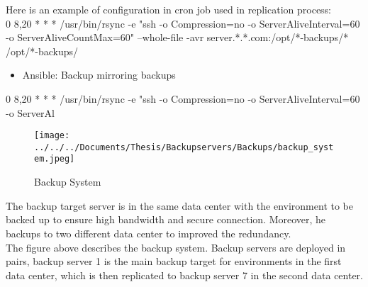 \documentclass[english]{tktltiki2}
\theoremstyle{definition}
\theoremstyle{remark}
\begin{document}
 Here is an example of configuration in cron job used in replication process:\\ 
 
 0 8,20 * * *  \enspace */usr/bin/rsync -e "ssh -o Compression=no -o ServerAliveInterval=60 -o ServerAliveCountMax=60" --whole-file -avr server.*.*.com:/opt/*-backups/* /opt/*-backups/
 \begin{itemize}
 \item Ansible: Backup mirroring backups
 \end{itemize}
0 8,20 * * * \enspace */usr/bin/rsync -e "ssh -o Compression=no -o ServerAliveInterval=60 -o ServerAl\\
\begin{figure}[h!]
\texttt{[image: ../../../Documents/Thesis/Backupservers/Backups/backup\_system.jpeg]} 
\caption{Backup System}
\label{fig:Backup} 
\end{figure}
\pagebreak

The backup target server is in the same data center with the environment to be backed up to ensure high bandwidth and secure connection. Moreover, he backups to two different data center to improved the redundancy.\\
The figure above describes the backup system. Backup servers are deployed in pairs, backup server 1 is the main backup target for environments in the first data center, which is then replicated to backup server 7 in the second data center.
\end{document}
